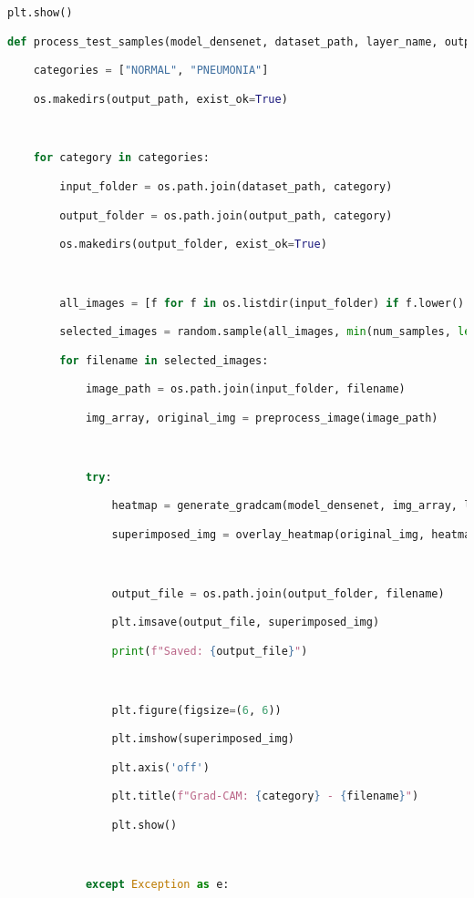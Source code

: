 \documentclass{article}
\begin{document}
\begin{lstlisting}[style=mystyle,language=Python]
plt.show()

def process_test_samples(model_densenet, dataset_path, layer_name, output_path, num_samples=5):

    categories = ["NORMAL", "PNEUMONIA"]

    os.makedirs(output_path, exist_ok=True)



    for category in categories:

        input_folder = os.path.join(dataset_path, category)

        output_folder = os.path.join(output_path, category)

        os.makedirs(output_folder, exist_ok=True)



        all_images = [f for f in os.listdir(input_folder) if f.lower().endswith(('.jpg', '.jpeg', '.png'))]

        selected_images = random.sample(all_images, min(num_samples, len(all_images)))

        for filename in selected_images:

            image_path = os.path.join(input_folder, filename)

            img_array, original_img = preprocess_image(image_path)



            try:

                heatmap = generate_gradcam(model_densenet, img_array, layer_name)

                superimposed_img = overlay_heatmap(original_img, heatmap)



                output_file = os.path.join(output_folder, filename)

                plt.imsave(output_file, superimposed_img)

                print(f"Saved: {output_file}")



                plt.figure(figsize=(6, 6))

                plt.imshow(superimposed_img)

                plt.axis('off')

                plt.title(f"Grad-CAM: {category} - {filename}")

                plt.show()



            except Exception as e:


\end{lstlisting}
\end{document}
